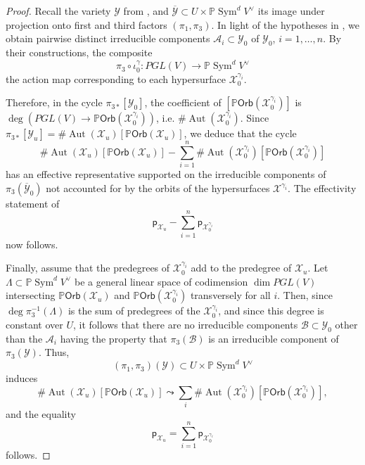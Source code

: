 \documentclass[12 pt, reqno]{amsart}
\theoremstyle{definition}
\newcommand{\on}{\operatorname}
\newcommand{\mb}{\mathbb}
\renewcommand{\P}{\mb{P}}
\newcommand{\Orb}{\mathsf{Orb}}
\newcommand{\p}{\mathsf{p}}
\begin{document}
\begin{proof}
  Recall the variety $\mathcal{Y}$ from , and
  $\overline{\mathcal{Y}} \subset U \times \P \on{Sym}^{d}V^{\vee}$
  its image under projection onto first and third factors
  $(\pi_{1},\pi_{3})$. In light of the hypotheses in ,
  we obtain pairwise distinct irreducible components
  $\mathcal{A}_{i} \subset \mathcal{Y}_{0}$ of $\mathcal{Y}_{0}$,
  $i=1, \dots, n$. By their constructions, the composite
  \[\pi_{3}\circ \iota^{\gamma}_{0}: PGL(V) \to \P \on{Sym}^{d}V^{\vee}\] the action map
  corresponding to each hypersurface $\mathcal{X}^{\gamma_{i}}_{0}$.


  Therefore, in the cycle $\pi_{3*}[\mathcal{Y}_{0}]$, the coefficient
  of $[\P \Orb(\mathcal{X}^{\gamma_{i}}_{0})]$ is
  $\deg(PGL(V) \to\P \Orb(\mathcal{X}^{\gamma_{i}}_{0}))$, i.e.
  $\# \on{Aut}(\mathcal{X}_{0}^{\gamma_{i}})$.  Since
  $\pi_{3*}[\mathcal{Y}_{u}] = \# \on{Aut}(\mathcal{X}_{u})[\P
  \Orb(\mathcal{X}_{u})]$, we deduce that the cycle
  \[\# \on{Aut}(\mathcal{X}_{u})[\P \Orb(\mathcal{X}_{u})] -
    \sum_{i=1}^{n} \# \on{Aut}(\mathcal{X}^{\gamma_{i}}_{0})[\P
    \Orb(\mathcal{X}^{\gamma_{i}}_{0})]\] has an effective
  representative supported on the irreducible components of
  $\pi_{3}(\overline{\mathcal{Y}}_{0})$ not accounted for by the
  orbits of the hypersurfaces $\mathcal{X}^{\gamma_{i}}$. The
  effectivity statement of
  \[\p_{\mathcal{X}_{u}}-\sum_{i=1}^{n}\p_{\mathcal{X}^{\gamma_{i}}_{0}}\]
  now follows.

  Finally, assume that the predegrees of
  $\mathcal{X}^{\gamma_{i}}_{0}$ add to the predegree of
  $\mathcal{X}_{u}$. Let $\Lambda \subset \P \on{Sym}^{d}V^{\vee}$ be
  a general linear space of codimension $\dim PGL(V)$ intersecting
  $\P \Orb(\mathcal{X}_{u})$ and
  $\P \Orb(\mathcal{X}^{\gamma_{i}}_{0})$ transversely for all $i$.
  Then, since $\deg \pi_{3}^{-1}(\Lambda)$ is the sum of predegrees of
  the $\mathcal{X}^{\gamma_{i}}_{0}$, and since this degree is
  constant over $U$, it follows that there are no irreducible
  components $\mathcal{B} \subset \mathcal{Y}_{0}$ other than the
  $\mathcal{A}_{i}$ having the property that $\pi_{3}(\mathcal{B})$ is
  an irreducible component of
  $\pi_{3}(\mathcal{Y})$. Thus,
  \[(\pi_{1},\pi_{3})(\mathcal{Y}) \subset U \times \P
    \on{Sym}^{d}V^{\vee}\] induces
  \[\# \on{Aut}(\mathcal{X}_{u})[\P \Orb(\mathcal{X}_{u})] \leadsto
    \sum_{i}\# \on{Aut}(\mathcal{X}^{\gamma_{i}}_{0})[\P
    \Orb(\mathcal{X}^{\gamma_{i}}_{0})],\] and the equality
  \[\p_{\mathcal{X}_u}=\sum_{i=1}^{n}\p_{\mathcal{X}^{\gamma_{i}}_{0}}\]
  follows.
\end{proof}
\end{document}
